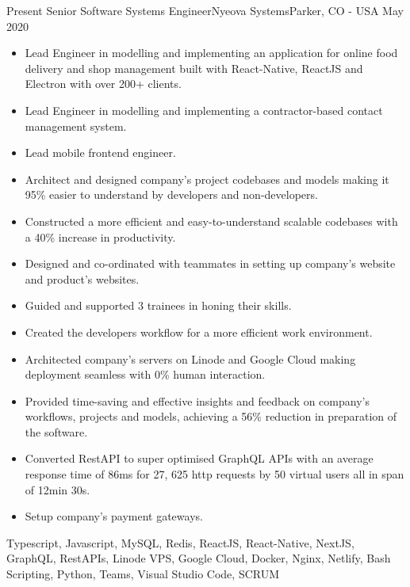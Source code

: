 %
%
%

\begin{experiences}
  
      \experience
    {Present}   {Senior Software Systems Engineer}{Nyeova Systems}{Parker, CO - USA}
    {May 2020} {
                      \begin{itemize}
                         \item	Lead Engineer in modelling and implementing an application for online food delivery and shop management built with React-Native, ReactJS and Electron with over 200+ clients.
                         \item Lead Engineer in modelling and implementing a contractor-based contact management system.
			\item Lead mobile frontend engineer.
			\item Architect and designed company's project codebases and models making it 95\% easier to understand by developers and non-developers.
			\item Constructed a more efficient and easy-to-understand scalable codebases with a 40\% increase in productivity.
			\item Designed and co-ordinated with teammates in setting up company's website and product's websites.
			\item Guided and supported 3 trainees in honing their skills.
			\item Created the developers workflow for a more efficient work environment.
			\item Architected company’s servers on Linode and Google Cloud making deployment seamless with 0\% human interaction.
			\item Provided time-saving and effective insights and feedback on company's workflows, projects and models, achieving a 56\% reduction in preparation of the software.
			\item Converted RestAPI to super optimised GraphQL APIs with an average response time of 86ms for 27, 625 http requests by 50 virtual users all in span of 12min 30s.
			\item Setup company's payment gateways.
		    \end{itemize}
                    }
                    {Typescript, Javascript, MySQL, Redis, ReactJS, React-Native, NextJS, GraphQL, RestAPIs, Linode VPS, Google Cloud, Docker, Nginx, Netlify, Bash Scripting, Python, Teams, Visual Studio Code, SCRUM}
  \emptySeparator
  

\end{experiences}
